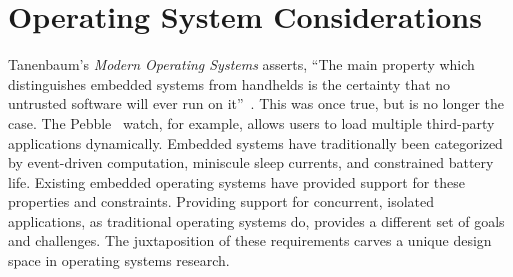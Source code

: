 \section{Operating System Considerations}
\label{os-considerations}

Tanenbaum's \emph{Modern Operating Systems} asserts, ``The main property which
distinguishes embedded systems from handhelds is the certainty that no untrusted
software will ever run on it''~\cite{tanenbaum}. This was once true, but is no
longer the case. The Pebble~\cite{pebble} watch, for example, allows users to
load multiple third-party applications dynamically.
Embedded systems have traditionally been categorized by event-driven computation,
miniscule sleep currents, and constrained battery life. Existing embedded operating systems
have provided support for these properties and constraints. Providing support for concurrent, isolated
applications, as traditional operating systems do, provides a different set
of goals and challenges.
The juxtaposition of these requirements
carves a unique design space in operating systems research.

%


